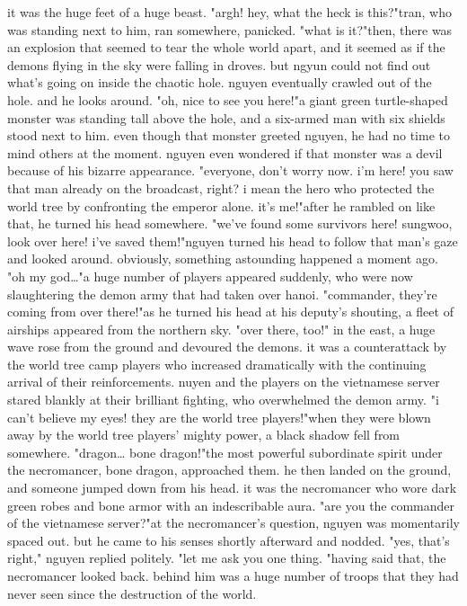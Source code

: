 it was the huge feet of a huge beast.
 "argh! hey, what the heck is this?"tran, who was standing next to him, ran somewhere, panicked.
"what is it?"then, there was an explosion that seemed to tear the whole world apart, and it seemed as if the demons flying in the sky were falling in droves.
 but ngyun could not find out what's going on inside the chaotic hole.
 nguyen eventually crawled out of the hole.
 and he looks around.
 "oh, nice to see you here!"a giant green turtle-shaped monster was standing tall above the hole, and a six-armed man with six shields stood next to him.
even though that monster greeted nguyen, he had no time to mind others at the moment.
 nguyen even wondered if that monster was a devil because of his bizarre appearance.
"everyone, don't worry now.
 i'm here! you saw that man already on the broadcast, right? i mean the hero who protected the world tree by confronting the emperor alone.
 it's me!"after he rambled on like that, he turned his head somewhere.
"we've found some survivors here! sungwoo, look over here! i've saved them!"nguyen turned his head to follow that man's gaze and looked around.
 obviously, something astounding happened a moment ago.
"oh my god…"a huge number of players appeared suddenly, who were now slaughtering the demon army that had taken over hanoi.
"commander, they're coming from over there!"as he turned his head at his deputy's shouting, a fleet of airships appeared from the northern sky.
"over there, too!"
in the east, a huge wave rose from the ground and devoured the demons.
it was a counterattack by the world tree camp players who increased dramatically with the continuing arrival of their reinforcements.
 nuyen and the players on the vietnamese server stared blankly at their brilliant fighting, who overwhelmed the demon army.
 "i can't believe my eyes! they are the world tree players!"when they were blown away by the world tree players' mighty power, a black shadow fell from somewhere.
"dragon… bone dragon!"the most powerful subordinate spirit under the necromancer, bone dragon, approached them.
he then landed on the ground, and someone jumped down from his head.
it was the necromancer who wore dark green robes and bone armor with an indescribable aura.
 "are you the commander of the vietnamese server?"at the necromancer's question, nguyen was momentarily spaced out.
 but he came to his senses shortly afterward and nodded.
"yes, that's right," nguyen replied politely.
"let me ask you one thing.
"having said that, the necromancer looked back.
 behind him was a huge number of troops that they had never seen since the destruction of the world.
